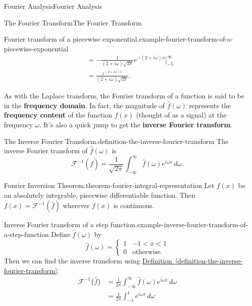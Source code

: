 \documentclass[10pt,]{book}
\newcommand{\terminology}[1]{\textbf{#1}}
\numberwithin{equation}{section}
\begin{document}
\begin{chapterptx}{Fourier Analysis}{}{Fourier Analysis}{}{}
\begin{sectionptx}{The Fourier Transform}{}{The Fourier Transform}{}{}
\begin{example}{Fourier transform of a piecewise exponential.}{example-fourier-transform-of-a-piecewise-exponential}
\begin{align*}
& = -\frac{1}{(2+i\omega)\sqrt{2\pi}}e^{-(2+i\omega)x}\Big]_{-5}^{\infty}\\
& = \frac{e^{(2+i\omega)5}}{(2+i\omega)\sqrt{2\pi}}. 
\end{align*}
%
\end{example}
\hypertarget{p-425}{}%
As with the Laplace transform, the Fourier transform of a function is said to be in the \terminology{frequency domain}. In fact, the magnitude of \(\hat{f}(\omega)\) represents the \terminology{frequency content} of the function \(f(x)\) (thought of as a signal) at the frequency \(\omega\). It's also a quick jump to get the \terminology{inverse Fourier transform}.%
\begin{definition}{The Inverse Fourier Transform.}{definition-the-inverse-fourier-transform}%
\hypertarget{p-426}{}%
The inverse Fourier transform of \(\hat{f}(\omega)\) is%
\begin{equation*}
\mathcal{F}^{-1}(\hat{f}) = \frac{1}{\sqrt{2\pi}}\int_{-\infty}^{\infty}\hat{f}(\omega)e^{i\omega x}\,d\omega.
\end{equation*}
%
\end{definition}
\begin{theorem}{Fourier Inversion Theorem.}{}{theorem-fourier-integral-representation}%
\hypertarget{p-427}{}%
Let \(f(x)\) be an absolutely integrable, piecewise differentiable function. Then \(f(x) = \mathcal{F}^{-1}(\hat{f})\) wherever \(f(x)\) is continuous.%
\end{theorem}
\begin{example}{Inverse Fourier transform of a step function.}{example-inverse-fourier-transform-of-a-step-function}%
\hypertarget{p-428}{}%
Define \(\hat{f}(\omega)\) by%
\begin{equation*}
\hat{f}(\omega) = \begin{cases} 1 & -1 < x < 1 \\ 0 & \text{otherwise.}\end{cases}
\end{equation*}
Then we can find the inverse transform using \hyperref[definition-the-inverse-fourier-transform]{Definition~\ref{definition-the-inverse-fourier-transform}}:%
\begin{align*}
\mathcal{F}^{-1}\{\hat{f}\} & = \frac{1}{2\pi}\int_{-\infty}^{\infty}\hat{f}(\omega)e^{i\omega x}\,d\omega \\
& = \frac{1}{2\pi}\int_{-1}^{1}e^{i\omega x}\,d\omega \\

\end{align*}
\end{example}
\end{sectionptx}
\end{chapterptx}
\end{document}
